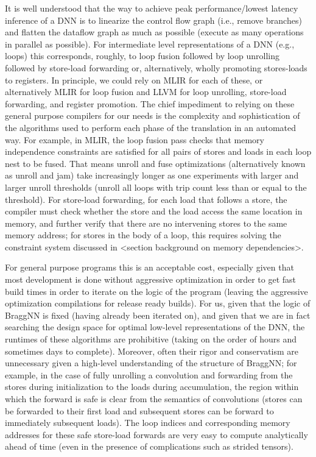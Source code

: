 It is well understood that the way to achieve peak performance/lowest latency inference of a DNN is to linearize the control flow graph\cite{osti_1574050} (i.e., remove branches) and flatten the dataflow graph as much as possible\cite{10.1145/3295500.3356173} (execute as many operations in parallel as possible).
For intermediate level representations of a DNN (e.g., loops) this corresponds, roughly, to loop fusion followed by loop unrolling followed by store-load forwarding or, alternatively, wholly promoting stores-loads to registers.
In principle, we could rely on MLIR for each of these, or alternatively MLIR for loop fusion and LLVM for loop unrolling, store-load forwarding, and register promotion.
The chief impediment to relying on these general purpose compilers for our needs is the complexity and sophistication of the algorithms used to perform each phase of the translation in an automated way.
For example, in MLIR, the loop fusion pass checks that memory independence constraints are satisfied for all pairs of stores and loads in each loop nest to be fused.
That means unroll and fuse optimizations (alternatively known as unroll and jam\cite{thomas1971catalogue}) take increasingly longer as one experiments with larger and larger unroll thresholds (unroll all loops with trip count less than or equal to the threshold).
For store-load forwarding, for each load that follows a store, the compiler must check whether the store and the load access the same location in memory, and further verify that there are no intervening stores to the same memory address; for stores in the body of a loop, this requires solving the constraint system discussed in <section background on memory dependencies>.

For general purpose programs this is an acceptable cost, especially given that most development is done without aggressive optimization in order to get fast build times in order to iterate on the logic of the program (leaving the aggressive optimization compilations for release ready builds).
For us, given that the logic of BraggNN is fixed (having already been iterated on), and given that we are in fact searching the design space for optimal low-level representations of the DNN, the runtimes of these algorithms are prohibitive (taking on the order of hours and sometimes days to complete).
Moreover, often their rigor and conservatism are unnecessary given a high-level understanding of the structure of BraggNN; for example, in the case of fully unrolling a convolution and forwarding from the stores during initialization to the loads during accumulation, the region within which the forward is safe is clear from the semantics of convolutions (stores can be forwarded to their first load and subsequent stores can be forward to immediately subsequent loads).
The loop indices and corresponding memory addresses for these safe store-load forwards are very easy to compute analytically ahead of time (even in the presence of complications such as strided tensors).

